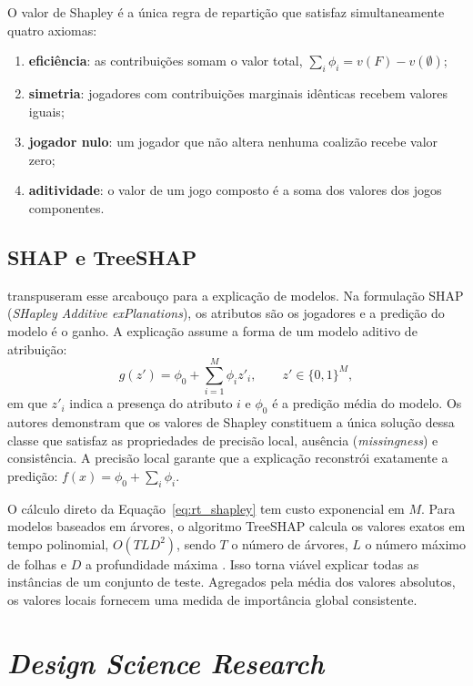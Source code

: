 O valor de Shapley é a única regra de repartição que satisfaz simultaneamente quatro axiomas:
\begin{enumerate}
    \item \textbf{eficiência}: as contribuições somam o valor total, $\sum_i \phi_i = v(F) - v(\emptyset)$;
    \item \textbf{simetria}: jogadores com contribuições marginais idênticas recebem valores iguais;
    \item \textbf{jogador nulo}: um jogador que não altera nenhuma coalizão recebe valor zero;
    \item \textbf{aditividade}: o valor de um jogo composto é a soma dos valores dos jogos componentes.
\end{enumerate}

\subsection{SHAP e TreeSHAP}

 transpuseram esse arcabouço para a explicação de modelos. Na formulação SHAP (\textit{SHapley Additive exPlanations}), os atributos são os jogadores e a predição do modelo é o ganho. A explicação assume a forma de um modelo aditivo de atribuição:
\begin{equation}
g(z') = \phi_0 + \sum_{i=1}^{M} \phi_i z'_i, \qquad z' \in \{0,1\}^M,
\label{eq:rt_shap}
\end{equation}
em que $z'_i$ indica a presença do atributo $i$ e $\phi_0$ é a predição média do modelo. Os autores demonstram que os valores de Shapley constituem a única solução dessa classe que satisfaz as propriedades de precisão local, ausência (\textit{missingness}) e consistência. A precisão local garante que a explicação reconstrói exatamente a predição: $f(x) = \phi_0 + \sum_i \phi_i$.

O cálculo direto da Equação~\eqref{eq:rt_shapley} tem custo exponencial em $M$. Para modelos baseados em árvores, o algoritmo TreeSHAP calcula os valores exatos em tempo polinomial, $O(TLD^2)$, sendo $T$ o número de árvores, $L$ o número máximo de folhas e $D$ a profundidade máxima \cite{lundberg2020local}. Isso torna viável explicar todas as instâncias de um conjunto de teste. Agregados pela média dos valores absolutos, os valores locais fornecem uma medida de importância global consistente.

\section{\textit{Design Science Research}}
\label{sec:rt_dsr}

